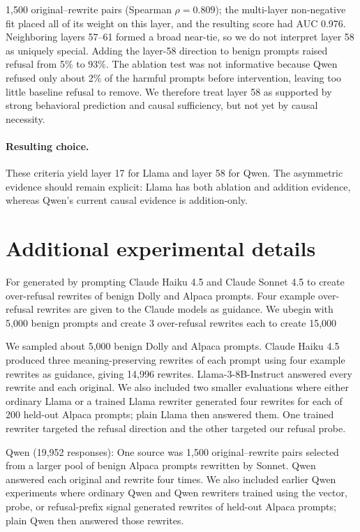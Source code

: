\documentclass{article}
\begin{document}
1{,}500 original--rewrite pairs (Spearman \(\rho=0.809\)); the multi-layer non-negative fit placed all of its weight on this layer, and the resulting score had AUC 0.976. Neighboring layers 57--61 formed a broad near-tie, so we do not interpret layer 58 as uniquely special. Adding the layer-58 direction to benign prompts raised refusal from 5\% to 93\%. The ablation test was not informative because Qwen refused only about 2\% of the harmful prompts before intervention, leaving too little baseline refusal to remove. We therefore treat layer 58 as supported by strong behavioral prediction and causal sufficiency, but not yet by causal necessity. \paragraph{Resulting choice.} These criteria yield layer 17 for Llama and layer 58 for Qwen. The asymmetric evidence should remain explicit: Llama has both ablation and addition evidence, whereas Qwen's current causal evidence is addition-only.\section{Additional experimental details}

For  generated by prompting Claude Haiku 4.5 and Claude Sonnet 4.5 to create over-refusal rewrites of benign Dolly and Alpaca prompts. Four example over-refusal rewrites are given to the Claude models as guidance. We ubegin with 5,000 benign prompts and create 3 over-refusal rewrites each to create 15,000


We sampled about 5,000 benign Dolly and Alpaca prompts. Claude Haiku 4.5 produced three meaning-preserving rewrites of each prompt using four example rewrites as guidance, giving 14,996 rewrites. Llama-3-8B-Instruct answered every rewrite and each original. We also included two smaller evaluations where either ordinary Llama or a trained Llama rewriter generated four rewrites for each of 200 held-out Alpaca prompts; plain Llama then answered them. One trained rewriter targeted the refusal direction and the other targeted our refusal probe.

Qwen (19,952 responses): One source was 1,500 original–rewrite pairs selected from a larger pool of benign Alpaca prompts rewritten by Sonnet. Qwen answered each original and rewrite four times. We also included earlier Qwen experiments where ordinary Qwen and Qwen rewriters trained using the vector, probe, or refusal-prefix signal generated rewrites of held-out Alpaca prompts; plain Qwen then answered those rewrites.



\end{document}
